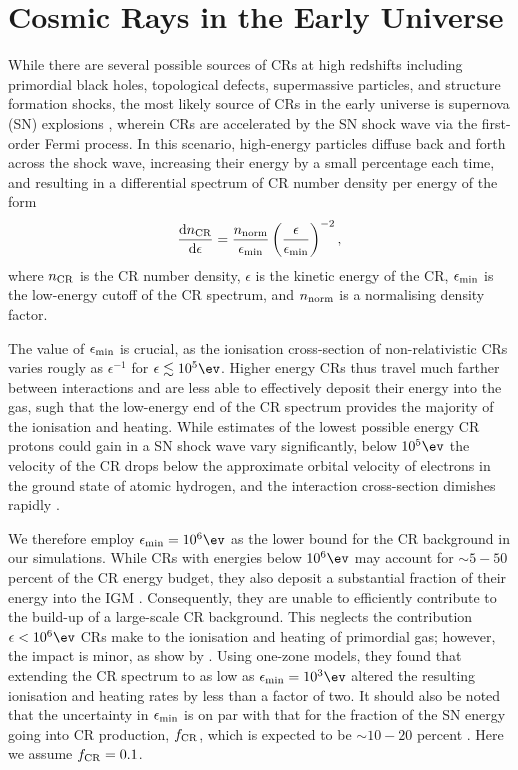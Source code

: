 \section{Cosmic Rays in the Early Universe}
\label{sec:context}
While there are several possible sources of CRs at high redshifts including primordial black holes, topological defects, supermassive particles, and structure formation shocks, the most likely source of CRs in the early universe is supernova (SN) explosions \citep[e.g.,][]{GinzburgSyrovatskii1969,BiermannSigl2001,Stanev2004,Pfrommeretal2006}, wherein CRs are accelerated by the SN shock wave via the first-order Fermi process.  In this scenario, high-energy particles diffuse back and forth across the shock wave, increasing their energy by a small percentage each time, and resulting in a differential spectrum of CR number density per energy \citep{Longair1994} of the form
\begin{equation}
    \frac{{\rm d}n_{\rm \small CR}}{{\rm d}\epsilon} = \frac{n_{\rm norm}}{\epsilon_{\rm min}}
    \left( \frac{\epsilon}{\epsilon_{\rm min}} \right)^{-2},
\end{equation}
where $n_{\rm \small CR}$ is the CR number density, $\epsilon$ is the kinetic energy of the CR, $\epsilon_{\rm min}$ is the low-energy cutoff of the CR spectrum, and $n_{\rm norm}$ is a normalising density factor. 

The value of $\epsilon_{\rm min}$ is crucial, as the ionisation cross-section of non-relativistic CRs varies rougly as $\epsilon^{-1}$ for $\epsilon \lesssim 10^5\ev$. Higher energy CRs thus travel much farther between interactions and are less able to effectively deposit their energy into the gas, sugh that the low-energy end of the CR spectrum provides the majority of the ionisation and heating.  While estimates of the lowest possible energy CR protons could gain in a SN shock wave vary significantly, below $10^5\ev$ the velocity of the CR drops below the approximate orbital velocity of electrons in the ground state of atomic hydrogen, and the interaction cross-section dimishes rapidly \citep{Schlickeiser2002}. 

We therefore employ $\epsilon_{\rm min} = 10^6\ev$ as the lower bound for the CR background in our simulations.  While CRs with energies below $10^6\ev$ may account for $\sim$$5-50$ percent of the CR energy budget, they also deposit a substantial fraction of their energy into the IGM \citep{SazonovSunyaev2015}. Consequently, they are unable to efficiently contribute to the build-up of a large-scale CR background. This neglects the contribution $\epsilon < 10^6\ev$ CRs make to the ionisation and heating of primordial gas; however, the impact is minor, as show by \citet{StacyBromm2007}. Using one-zone models, they found that extending the CR spectrum to as low as $\epsilon_{\rm min} = 10^3\ev$ altered the resulting ionisation and heating rates by less than a factor of two.  It should also be noted that the uncertainty in $\epsilon_{\rm min}$ is on par with that for the fraction of the SN energy going into CR production, $f_{\rm \small CR}$, which is expected to be $\sim$$10-20$ percent \citep{CaprioliSpitkovsky2014}.  Here we assume $f_{\rm \small CR} = 0.1$.

